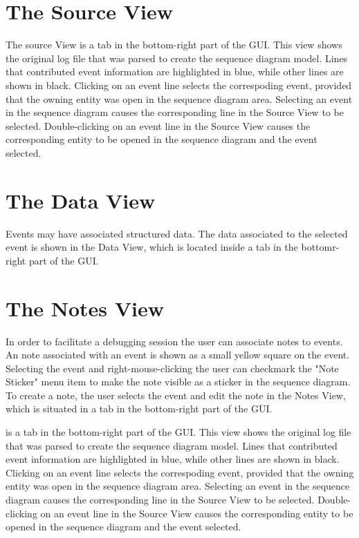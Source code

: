 \documentclass[11pt, twoside, titlepage]{book}
\begin{document}
\section{The Source View}
The source View is a tab in the bottom-right part of the GUI. This view shows the original log file that was 
parsed to create the sequence diagram model. Lines that contributed event information are highlighted in blue, 
while other lines are shown in black. Clicking on an event line selects the correspoding event, provided that the
owning entity was open in the sequence diagram area. Selecting an event in the sequence diagram causes the 
corresponding line in the Source View to be selected. Double-clicking on an event line in the Source View
causes the corresponding entity to be opened in the sequence diagram and the event selected.

\section{The Data View}
Events may have associated structured data. The data associated to the selected event is shown in the Data View,
which is located inside a tab in the bottomr-right part of the GUI. 

\section{The Notes View}
In order to facilitate a debugging session the user can associate notes to events. An note associated with an
event is shown as a small yellow square on the event. Selecting the event and right-mouse-clicking the user can
checkmark the "Note Sticker" menu item to make the note visible as a sticker in the sequence diagram.
To create a note, the user selects the event and edit the note in the Notes View, which is situated in a tab
in the bottom-right part of the GUI.

 
is a tab in the bottom-right part of the GUI. This view shows the original log file that was 
parsed to create the sequence diagram model. Lines that contributed event information are highlighted in blue, 
while other lines are shown in black. Clicking on an event line selects the correspoding event, provided that the
owning entity was open in the sequence diagram area. Selecting an event in the sequence diagram causes the 
corresponding line in the Source View to be selected. Double-clicking on an event line in the Source View
causes the corresponding entity to be opened in the sequence diagram and the event selected.
\end{document}
